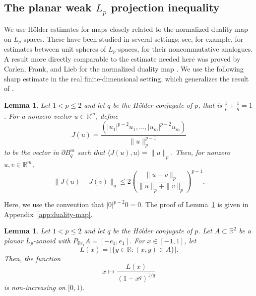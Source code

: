 \documentclass[11pt,a4paper]{amsart}
\theoremstyle{plain}
\newtheorem{lemma}[theorem]{Lemma}
\theoremstyle{definition}
\newcommand{\R}{\mathbb R}
\begin{document}
\subsection{The planar weak \texorpdfstring{$L_p$}{Lp} projection inequality}
\label{sec:planar-one-term-lp}


 We use H\"older estimates for maps closely related to the normalized duality map on $L_p$-spaces. These have been studied in several settings; see, for example, \cite[Chapter 9]{BL-00} for estimates between unit spheres of $L_p$-spaces, \cite{Ricard-15} for their noncommutative analogues. A result more directly comparable to the estimate needed here was proved by Carlen, Frank, and Lieb for the normalized duality map \cite[Lemma 3.3]{CFL-14}. We use the following sharp estimate in the real finite-dimensional setting, which generalizes the result of \cite{DW-64}.

\begin{lemma}
\label{lem:mazur-map-section}
Let $1<p\leq2$ and let $q$ be  the H\"older conjugate of $p$, that is $\frac{1}{p} + \frac{1}{q} = 1$. For a nonzero vector $u\in\R^m$, define
\[
    J(u)=\frac{(|u_1|^{p-2}u_1,\ldots,|u_m|^{p-2}u_m)}{\|u\|_p^{p-1}}
\]
to be the vector in $\partial B_q^m$ such that $\langle J(u),u\rangle=\|u\|_p$.
Then, for nonzero $u,v\in\R^m$,
\begin{equation}
\label{eq:mazur-map-estimate-section}
    \|J(u)-J(v)\|_q
    \leq
    2\left(
       \frac{\|u-v\|_p}{\|u\|_p+\|v\|_p}
    \right)^{p-1}.
\end{equation}
\end{lemma}
Here, we use the convention that $|0|^{p-2}0 = 0$.
The proof of Lemma~\ref{lem:mazur-map-section} is given in
Appendix~\ref{app:duality-map}.


\begin{lemma}
\label{lem:chord-speed-planar-section}
Let $1<p\leq2$ and let $q$ be  the H\"older conjugate of $p$. Let $A\subset\R^2$ be a planar $L_p$-zonoid with $P_{\R e_1}A=[-e_1,e_1]$. For $x\in[-1,1]$, let
\[
    L(x)=\big|\{y\in\R:(x,y)\in A\}\big|.
\]
Then, the function
\begin{equation}
\label{eq:chord-speed-monotone}
    x\mapsto \frac{L(x)}{(1-x^q)^{1/q}}
\end{equation}
is non-increasing on $[0,1)$.
\end{lemma}
\end{document}
